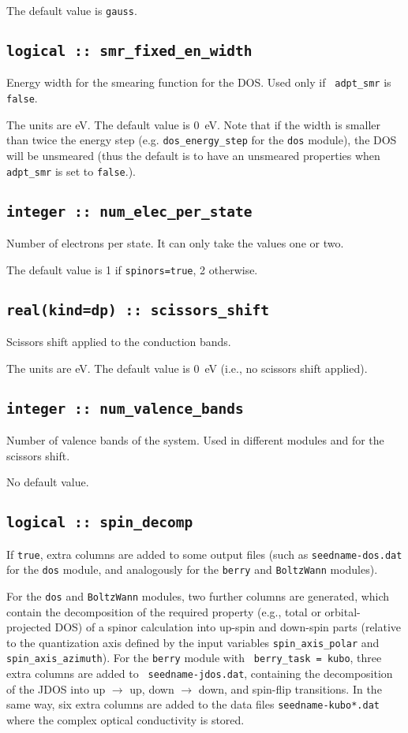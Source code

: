 The default value is {\tt gauss}.

\subsection[smr\_fixed\_en\_width]{\tt logical :: smr\_fixed\_en\_width}
Energy width for the smearing function for the DOS. Used only if {\tt
  adpt\_smr} is \verb#false#.

The units are eV. The default value is 0~eV. Note that if the width is
smaller than twice the energy step (e.g. {\tt dos\_energy\_step} for
the {\tt dos} module), the DOS
will be unsmeared (thus the default is to have an unsmeared
properties when {\tt  adpt\_smr} is set to \verb#false#.).


  \subsection{\tt integer :: num\_elec\_per\_state} 
Number of electrons per state. It can only take the values one or
two.

The default value is 1 if {\tt spinors=true}, 2 otherwise.

  \subsection{\tt real(kind=dp) :: scissors\_shift} 
Scissors shift applied to the conduction bands.

The units are eV. The default value is 0~eV (i.e., no scissors shift applied).

  \subsection{\tt integer :: num\_valence\_bands} 
Number of valence bands of the system. Used in different modules and
for the scissors shift.

No default value.


\subsection[spin\_decomp]{\tt logical :: spin\_decomp}
If {\tt true}, extra columns are added to some output files (such as
{\tt seedname-dos.dat} for the {\tt dos} module, and analogously for
the {\tt berry} and {\tt BoltzWann} modules).

For the {\tt dos} and {\tt BoltzWann} modules, two further columns are
generated, which contain the decomposition of the required property
(e.g., total or orbital-projected DOS) of a spinor calculation into
up-spin and down-spin parts (relative to the quantization axis defined
by the input variables {\tt spin\_axis\_polar} and {\tt
  spin\_axis\_azimuth}).  For the {\tt berry} module with {\tt
  berry\_task = kubo}, three extra columns are added to {\tt
  seedname-jdos.dat}, containing the decomposition of the JDOS into up
$\rightarrow$ up, down $\rightarrow$ down, and spin-flip
transitions. In the same way, six extra columns are added to the data
files {\tt seedname-kubo*.dat} where the complex optical conductivity
is stored.

